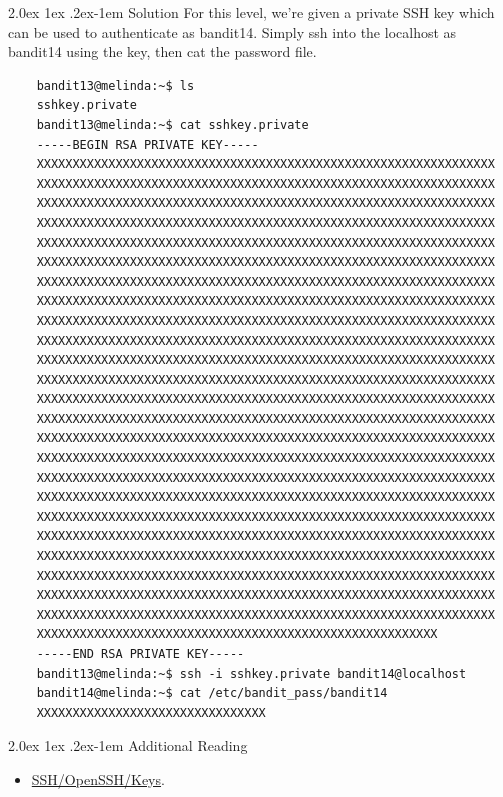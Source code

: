 \documentclass[11pt]{article}
\makeatletter
\renewcommand{\paragraph}{%
  \@startsection{paragraph}{4}%
  {\z@}{2.0ex \@plus 1ex \@minus .2ex}{-1em}%
  {\normalfont\normalsize\bfseries}%
}
\makeatother
\begin{document}
\paragraph{Solution}
For this level, we're given a private SSH key which can be used to authenticate as bandit14. Simply ssh into the localhost as bandit14 using the key, then cat the password file.
\begin{lstlisting}
	bandit13@melinda:~$ ls
	sshkey.private
	bandit13@melinda:~$ cat sshkey.private 
	-----BEGIN RSA PRIVATE KEY-----
	XXXXXXXXXXXXXXXXXXXXXXXXXXXXXXXXXXXXXXXXXXXXXXXXXXXXXXXXXXXXXXXX
	XXXXXXXXXXXXXXXXXXXXXXXXXXXXXXXXXXXXXXXXXXXXXXXXXXXXXXXXXXXXXXXX
	XXXXXXXXXXXXXXXXXXXXXXXXXXXXXXXXXXXXXXXXXXXXXXXXXXXXXXXXXXXXXXXX
	XXXXXXXXXXXXXXXXXXXXXXXXXXXXXXXXXXXXXXXXXXXXXXXXXXXXXXXXXXXXXXXX
	XXXXXXXXXXXXXXXXXXXXXXXXXXXXXXXXXXXXXXXXXXXXXXXXXXXXXXXXXXXXXXXX
	XXXXXXXXXXXXXXXXXXXXXXXXXXXXXXXXXXXXXXXXXXXXXXXXXXXXXXXXXXXXXXXX
	XXXXXXXXXXXXXXXXXXXXXXXXXXXXXXXXXXXXXXXXXXXXXXXXXXXXXXXXXXXXXXXX
	XXXXXXXXXXXXXXXXXXXXXXXXXXXXXXXXXXXXXXXXXXXXXXXXXXXXXXXXXXXXXXXX
	XXXXXXXXXXXXXXXXXXXXXXXXXXXXXXXXXXXXXXXXXXXXXXXXXXXXXXXXXXXXXXXX
	XXXXXXXXXXXXXXXXXXXXXXXXXXXXXXXXXXXXXXXXXXXXXXXXXXXXXXXXXXXXXXXX
	XXXXXXXXXXXXXXXXXXXXXXXXXXXXXXXXXXXXXXXXXXXXXXXXXXXXXXXXXXXXXXXX
	XXXXXXXXXXXXXXXXXXXXXXXXXXXXXXXXXXXXXXXXXXXXXXXXXXXXXXXXXXXXXXXX
	XXXXXXXXXXXXXXXXXXXXXXXXXXXXXXXXXXXXXXXXXXXXXXXXXXXXXXXXXXXXXXXX
	XXXXXXXXXXXXXXXXXXXXXXXXXXXXXXXXXXXXXXXXXXXXXXXXXXXXXXXXXXXXXXXX
	XXXXXXXXXXXXXXXXXXXXXXXXXXXXXXXXXXXXXXXXXXXXXXXXXXXXXXXXXXXXXXXX
	XXXXXXXXXXXXXXXXXXXXXXXXXXXXXXXXXXXXXXXXXXXXXXXXXXXXXXXXXXXXXXXX
	XXXXXXXXXXXXXXXXXXXXXXXXXXXXXXXXXXXXXXXXXXXXXXXXXXXXXXXXXXXXXXXX
	XXXXXXXXXXXXXXXXXXXXXXXXXXXXXXXXXXXXXXXXXXXXXXXXXXXXXXXXXXXXXXXX
	XXXXXXXXXXXXXXXXXXXXXXXXXXXXXXXXXXXXXXXXXXXXXXXXXXXXXXXXXXXXXXXX
	XXXXXXXXXXXXXXXXXXXXXXXXXXXXXXXXXXXXXXXXXXXXXXXXXXXXXXXXXXXXXXXX
	XXXXXXXXXXXXXXXXXXXXXXXXXXXXXXXXXXXXXXXXXXXXXXXXXXXXXXXXXXXXXXXX
	XXXXXXXXXXXXXXXXXXXXXXXXXXXXXXXXXXXXXXXXXXXXXXXXXXXXXXXXXXXXXXXX
	XXXXXXXXXXXXXXXXXXXXXXXXXXXXXXXXXXXXXXXXXXXXXXXXXXXXXXXXXXXXXXXX
	XXXXXXXXXXXXXXXXXXXXXXXXXXXXXXXXXXXXXXXXXXXXXXXXXXXXXXXXXXXXXXXX
	XXXXXXXXXXXXXXXXXXXXXXXXXXXXXXXXXXXXXXXXXXXXXXXXXXXXXXXX
	-----END RSA PRIVATE KEY-----
	bandit13@melinda:~$ ssh -i sshkey.private bandit14@localhost
	bandit14@melinda:~$ cat /etc/bandit_pass/bandit14
	XXXXXXXXXXXXXXXXXXXXXXXXXXXXXXXX
\end{lstlisting}
\paragraph{Additional Reading}
\begin{itemize}
\itemsep0em
\item \href{https://help.ubuntu.com/community/SSH/OpenSSH/Keys}{SSH/OpenSSH/Keys}.
\end{itemize}
\newpage
\end{document}

